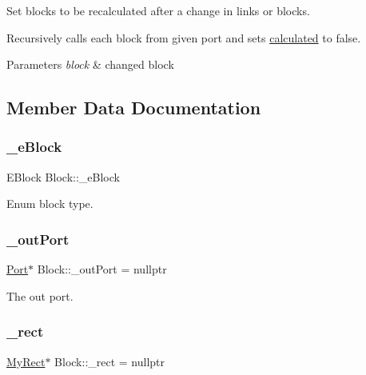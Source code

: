 Set blocks to be recalculated after a change in links or blocks.

Recursively calls each block from given port and sets \hyperlink{classBlock_a78ba2fc9a1343e5d9f6f372888e90bf2}{calculated} to false. 
\begin{DoxyParams}{Parameters}
{\em block} & changed block \\
\hline
\end{DoxyParams}


\subsection{Member Data Documentation}
\mbox{\label{classBlock_a2078fc6dc0ee457f3332a38685fea0af}} 
\subsubsection{\texorpdfstring{\+\_\+e\+Block}{\_eBlock}}
{\footnotesize\ttfamily E\+Block Block\+::\+\_\+e\+Block\hspace{0.3cm}{\ttfamily [private]}}

Enum block type. \mbox{\label{classBlock_a07a89d0108abe2b1ab8b69aabe815d73}} 
\subsubsection{\texorpdfstring{\+\_\+out\+Port}{\_outPort}}
{\footnotesize\ttfamily \hyperlink{classPort}{Port}$\ast$ Block\+::\+\_\+out\+Port = nullptr\hspace{0.3cm}{\ttfamily [private]}}

The out port. \mbox{\label{classBlock_a310ce3c87df1c29e3bfa15aafb9b21c0}} 
\subsubsection{\texorpdfstring{\+\_\+rect}{\_rect}}
{\footnotesize\ttfamily \hyperlink{classMyRect}{My\+Rect}$\ast$ Block\+::\+\_\+rect = nullptr\hspace{0.3cm}{\ttfamily [private]}}

